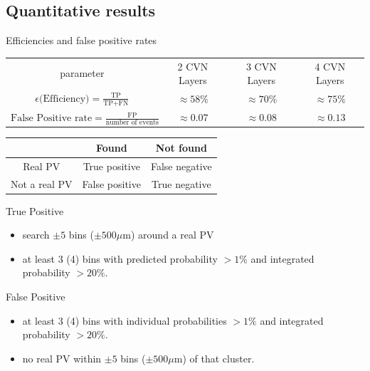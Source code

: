 \subsection{Quantitative results}
\begin{frame}{Efficiencies and false positive rates}
\begin{table}[]
\centering
\begin{tabular}{cccc}
parameter & 2 CVN Layers &
3 CVN Layers & 4 CVN Layers \\ [0.3em]

$\epsilon \textrm{(Efficiency)}
 = \frac{\mbox{TP}}{\mbox{TP} + \mbox{FN}} $
&  $ \approx 58\% $  & $ \approx 70\% $ & $ \approx 75\% $ \\ [0.3em]
$ \textrm{False Positive rate}
 = \frac{\mbox{FP}}{\mbox{number of events}} $
 &  $\approx 0.07 $ & $\approx 0.08 $  & $ \approx 0.13 $ \\
 \end{tabular}
\end{table}
 \vskip -0.05in
  \begin{table}[]
      \centering
      \begin{tabular}{c|cc}
         & Found & Not found \\ \midrule
         Real PV & True positive & False negative\\
         Not a real PV & False positive & True negative
      \end{tabular}
  \end{table}
  \vskip -0.15in
  \begin{block}{True Positive}
    \begin{itemize}
    	\item search $ \pm 5 $ bins ($ \pm 500 \mu $m) around a real PV
    	\item at least 3 (4) bins with predicted probability
    	   $ > 1\% $ and
    	   integrated probability $ > 20\%$.
    \end{itemize}

    \end{block}
    \begin{block}{False Positive}
    \begin{itemize}
        \item
           at least 3 (4) bins with individual probabilities $ > 1\% $ and
          integrated probability $ > 20\%$.
        \item
        no real PV within $ \pm 5 $ bins ($ \pm 500 \mu $m) of that cluster.
    \end{itemize}
  \end{block}
\end{frame}

